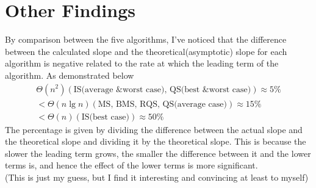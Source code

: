 \documentclass[11pt]{article}
\theoremstyle{definition}
\begin{document}
\section*{Other Findings}
By comparison between the five algorithms, I've noticed that the difference between the calculated slope and the theoretical(asymptotic) slope for each algorithm is negative related to the rate at which the leading term of the algorithm. As demonstrated below
\begin{gather*}
  \Theta(n^2)(\text{IS(average \& worst case), QS(best \& worst case)}) \approx 5\%  \\
  < \Theta(n\lg{n})(\text{MS, BMS, RQS, QS(average case)}) \approx 15\% \\ 
  < \Theta(n)(\text{IS(best case)}) \approx 50\%
\end{gather*}
The percentage is given by dividing the difference between the actual slope and the theoretical slope and dividing it by the theoretical slope. This is because the slower the leading term grows, the smaller the difference between it and the lower terms is, and hence the effect of the lower terms is more significant. \\ 
(This is just my guess, but I find it interesting and convincing at least to myself)
\end{document}
